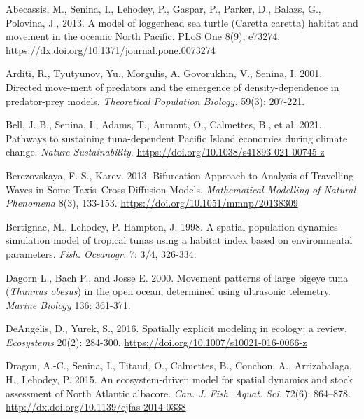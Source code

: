 


\begin{thebibliography}{}

 Abecassis, M., Senina, I., Lehodey, P., Gaspar, P., Parker, D., Balazs, G., Polovina, J., 2013. A model of loggerhead sea turtle (Caretta caretta) habitat and movement in the oceanic North Pacific. PLoS One 8(9), e73274. \url{https://dx.doi.org/10.1371/journal.pone.0073274}

 Arditi, R., Tyutyunov, Yu., Morgulis, A. Govorukhin, V., Senina, I. 2001. Directed move-ment of predators and the emergence of density-dependence in predator-prey models. \textit {Theoretical Population Biology.} 59(3): 207-221.

 Bell, J. B., Senina, I., Adams, T., Aumont, O., Calmettes, B., et al. 2021. Pathways to sustaining tuna-dependent Pacific Island economies during climate change. \textit{Nature Sustainability}. \url{https://doi.org/10.1038/s41893-021-00745-z}

 Berezovskaya, F. S.,  Karev. 2013. Bifurcation Approach to Analysis of Travelling Waves in Some Taxis–Cross-Diffusion Models. \textit {Mathematical Modelling of Natural Phenomena} 8(3), 133-153. \url{https://doi.org/10.1051/mmnp/20138309}

 Bertignac, M., Lehodey, P. Hampton, J. 1998. A spatial population dynamics simulation model of tropical tunas using a habitat index based on environmental parameters. \textit {Fish. Oceanogr.} 7: 3/4, 326-334.

 Dagorn L., Bach P., and Josse E. 2000. Movement patterns of large bigeye tuna ({\it Thunnus obesus}) in the open ocean, determined using ultrasonic telemetry. \textit {Marine Biology} 136: 361-371.

 DeAngelis, D., Yurek, S., 2016. Spatially explicit modeling in ecology: a review. \textit{Ecosystems} 20(2): 284-300. \url{https://doi.org/10.1007/s10021-016-0066-z}

 Dragon, A.-C., Senina, I., Titaud, O., Calmettes, B., Conchon, A., Arrizabalaga, H., Lehodey, P. 2015. An ecosystem-driven model for spatial dynamics and stock assessment of North Atlantic albacore. \textit{Can. J. Fish. Aquat. Sci.} 72(6): 864–878. \url{http://dx.doi.org/10.1139/cjfas-2014-0338}


\end{thebibliography}
